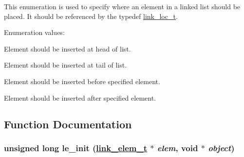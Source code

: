 This enumeration is used to specify where an element in a linked list should be placed. It should be referenced by the typedef \hyperlink{group__dbprim__link_a4}{link\_\-loc\_\-t}. \begin{Desc}
\item[Enumeration values: ]\par
\begin{description}
\item[{\em 
\hypertarget{group__dbprim__link_a26a132}{
{\em LINK\_\-LOC\_\-HEAD}}
\label{group__dbprim__link_a26a132}
}]Element should be inserted at head of list. \item[{\em 
\hypertarget{group__dbprim__link_a26a133}{
{\em LINK\_\-LOC\_\-TAIL}}
\label{group__dbprim__link_a26a133}
}]Element should be inserted at tail of list. \item[{\em 
\hypertarget{group__dbprim__link_a26a134}{
{\em LINK\_\-LOC\_\-BEFORE}}
\label{group__dbprim__link_a26a134}
}]Element should be inserted before specified element. \item[{\em 
\hypertarget{group__dbprim__link_a26a135}{
{\em LINK\_\-LOC\_\-AFTER}}
\label{group__dbprim__link_a26a135}
}]Element should be inserted after specified element. \end{description}
\end{Desc}



\subsection{Function Documentation}
\hypertarget{group__dbprim__link_a12}{
\subsubsection[le\_\-init]{\setlength{\rightskip}{0pt plus 5cm}unsigned long le\_\-init (\hyperlink{group__dbprim__link_a1}{link\_\-elem\_\-t} $\ast$ {\em elem}, void $\ast$ {\em object})}}
\label{group__dbprim__link_a12}


